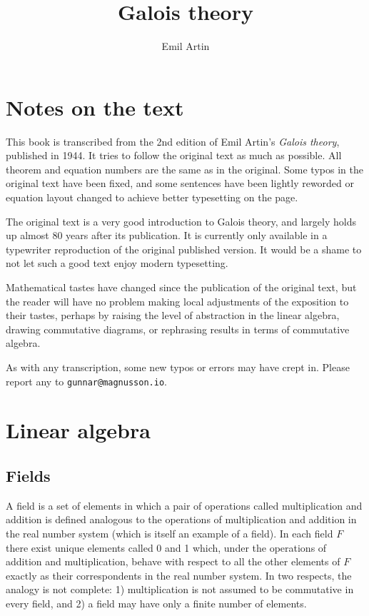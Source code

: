 \documentclass[10pt,leqno,a5paper]{book}
\author{Emil Artin}
\title{Galois theory}
\date{}
\theoremstyle{definition}
\let\hon\chapter
\let\htw\section
\begin{document}
\pagestyle{empty}
\frontmatter
\maketitle

\small
\tableofcontents
\thispagestyle{empty}
\normalsize



\chapter*{Notes on the text}
\thispagestyle{empty}

This book is transcribed from the 2nd edition of Emil Artin's \emph{Galois theory}, published in 1944.
It tries to follow the original text as much as possible.
All theorem and equation numbers are the same as in the original.
Some typos in the original text have been fixed, and some sentences have been lightly reworded or equation layout changed to achieve better typesetting on the page.


\medskip
The original text is a very good introduction to Galois theory, and largely holds up almost 80 years after its publication.
It is currently only available in a typewriter reproduction of the original published version.
It would be a shame to not let such a good text enjoy modern typesetting.

\medskip
Mathematical tastes have changed since the publication of the original text, but the reader will have no problem making local adjustments of the exposition to their tastes, perhaps by raising the level of abstraction in the linear algebra, drawing commutative diagrams, or rephrasing results in terms of commutative algebra.


\medskip
As with any transcription, some new typos or errors may have crept in.
Please report any to \texttt{gunnar@magnusson.io}.



\mainmatter
\pagestyle{fancy}


\hon{Linear algebra}
\thispagestyle{empty}


\htw{Fields}


A field is a set of elements in which a pair of operations called multiplication and addition is defined analogous to the operations of multiplication and addition in the real number system (which is itself an example of a field).
In each field $F$ there exist unique elements called 0 and 1 which, under the operations of addition and multiplication, behave with respect to all the other elements of $F$ exactly as their correspondents in the real number system.
In two respects, the analogy is not complete: 1) multiplication is not assumed to be commutative in every field, and 2) a field may have only a finite number of elements.
\end{document}
